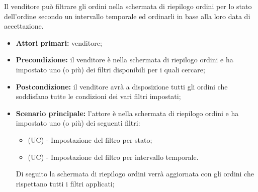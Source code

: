 Il venditore può filtrare gli ordini nella schermata di riepilogo ordini per lo stato dell'ordine secondo un intervallo temporale ed ordinarli in base alla loro data di accettazione.
\begin{itemize}
	\item \textbf{Attori primari:} venditore;
	\item \textbf{Precondizione:} il venditore è nella schermata di riepilogo ordini e ha impostato uno (o più) dei filtri disponibili per i quali cercare;
	\item \textbf{Postcondizione:} il venditore avrà a disposizione tutti gli ordini che soddisfano tutte le condizioni dei vari filtri impostati;
	\item \textbf{Scenario principale:} l'attore è nella schermata di riepilogo ordini e ha impostato uno (o più) dei seguenti filtri:
	\begin{itemize}
		\item (UC) - Impostazione del filtro per stato;
		\item (UC) - Impostazione del filtro per intervallo temporale.
	\end{itemize}
	Di seguito la schermata di riepilogo ordini verrà aggiornata con gli ordini che rispettano tutti i filtri applicati;
\end{itemize}

